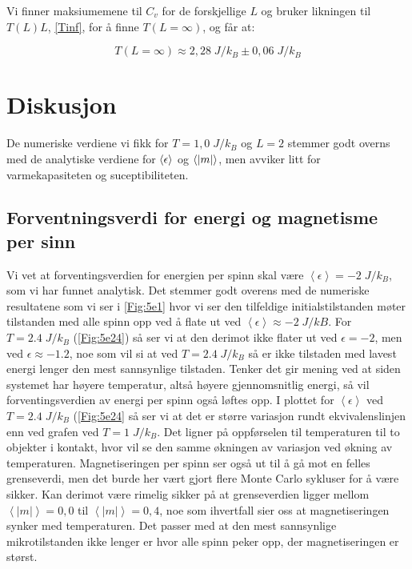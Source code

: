 \documentclass[reprint,english,notitlepage]{revtex4-2}  %
\begin{document}
Vi finner maksiumemene til $C_v$ for de forskjellige $L$ og bruker likningen til $T\left ( L \right ) L$, \eqref{Tinf}, for å finne $T \left ( L = \infty \right )$, og får at:

$$ T \left ( L = \infty \right ) \approx 2,28 \; J/k_B \pm 0,06 \; J/k_B$$

\section{Diskusjon}

De numeriske verdiene vi fikk for $T = 1,0 \; J/k_B$ og $L = 2$ stemmer godt overns med de analytiske verdiene for $\expval{\epsilon}$ og $\expval{|m|}$, men avviker litt for varmekapasiteten og suceptibiliteten.

\subsection*{Forventningsverdi for energi og magnetisme per sinn}

Vi vet at forventingsverdien for energien per spinn skal være $\left < \epsilon \right > = -2 \; J/k_B$, som vi har funnet analytisk. Det stemmer godt overens med de numeriske resultatene som vi ser i \autoref{Fig:5e1} hvor vi ser den tilfeldige initialstilstanden møter tilstanden med alle spinn opp ved å flate ut ved $\left < \epsilon \right > \approx -2 \; J/kB$. For $T = 2.4 \; J/k_B$ (\autoref{Fig:5e24}) så ser vi at den derimot ikke flater ut ved $ \epsilon = -2$, men ved $\epsilon \approx -1.2 $, noe som vil si at ved $T = 2.4 \; J/k_B$ så er ikke tilstaden med lavest energi lenger den mest sannsynlige tilstaden. Tenker det gir mening ved at siden systemet har høyere temperatur, altså høyere gjennomsnitlig energi, så vil forventingsverdien av energi per spinn også løftes opp. I plottet for $\left < \epsilon \right >$ ved $T = 2.4  \; J/k_B$ (\autoref{Fig:5e24} så ser vi at det er større variasjon rundt ekvivalenslinjen enn ved grafen ved $T = 1 \; J/k_B$. Det ligner på oppførselen til temperaturen til to objekter i kontakt, hvor vil se den samme økningen av variasjon ved økning av temperaturen. Magnetiseringen per spinn ser også ut til å gå mot en felles grenseverdi, men det burde her vært gjort flere Monte Carlo sykluser for å være sikker. Kan derimot være rimelig sikker på at grenseverdien ligger mellom $\left < | m | \right > = 0,0$ til $\left < | m | \right > = 0,4$, noe som ihvertfall sier oss at magnetiseringen synker med temperaturen. Det passer med at den mest sannsynlige mikrotilstanden ikke lenger er hvor alle spinn peker opp, der magnetiseringen er størst.
\end{document}
